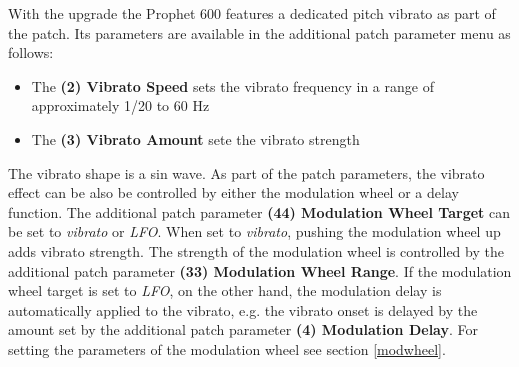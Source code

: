 With the upgrade the Prophet 600 features a dedicated pitch vibrato as part of the patch. Its parameters are available in the additional patch parameter menu as follows:

\begin{itemize}
  \item The \textbf{(2) Vibrato Speed} sets the vibrato frequency in a range of approximately 1/20 to 60 Hz
  \item The \textbf{(3) Vibrato Amount} sete the vibrato strength
\end{itemize}

The vibrato shape is a sin wave. As part of the patch parameters, the vibrato effect can be also be controlled by either the modulation wheel or a delay function. The additional patch parameter \textbf{(44) Modulation Wheel Target} can be set to \textit{vibrato} or \textit{LFO}. When set to \textit{vibrato}, pushing the modulation wheel up adds vibrato strength. The strength of the modulation wheel is controlled by the additional patch parameter \textbf{(33) Modulation Wheel Range}. If the modulation wheel target is set to \textit{LFO}, on the other hand, the modulation delay is automatically applied to the vibrato, e.g. the vibrato onset is delayed by the amount set by the additional patch parameter \textbf{(4) Modulation Delay}. For setting the parameters of the modulation wheel see section \ref{modwheel}.
